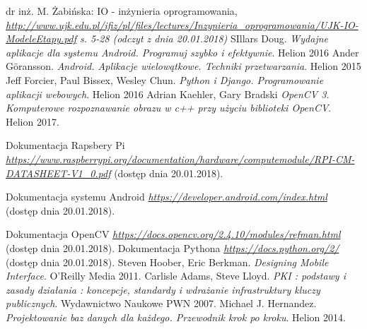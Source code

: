 \newpage
   \begin{thebibliography}{9}
    	dr inż. M. Żabińska: IO - inżynieria oprogramowania,
    	\textit{\href{http://www.ujk.edu.pl/ifiz/pl/files/lectures/Inzynieria\_oprogramowania/UJK-IO-ModeleEtapy.pdf}{http://www.ujk.edu.pl/ifiz/pl/files/lectures/Inzynieria\_oprogramowania/UJK-IO-ModeleEtapy.pdf} s. 5-28 (odczyt z dnia 20.01.2018)}
    	SIllars Doug.
    	\textit{Wydajne aplikacje dla systemu Android. Programuj szybko i efektywnie}. 
    	Helion 2016
    	Ander Göransson. 
    	\textit{Android. Aplikacje wielowątkowe. Techniki przetwarzania}. 
    	Helion 2015
    	Jeff Forcier, Paul Bissex, Wesley Chun.
    	\textit{Python i Django. Programowanie aplikacji webowych}. 
    	Helion 2016
    	Adrian Kaehler, Gary Bradski 
    	\textit{OpenCV 3. Komputerowe rozpoznawanie obrazu w c++ przy użyciu biblioteki OpenCV}. 
    	Helion 2017.
    
    		Dokumentacja Rapsbery Pi
    	\textit{ \href {https://www.raspberrypi.org/documentation/hardware/computemodule/RPI-CM-DATASHEET-V1_0.pdf} {https://www.raspberrypi.org/documentation/hardware/computemodule/RPI-CM-DATASHEET-V1\_0.pdf} }(dostęp dnia 20.01.2018). 
    	
    	Dokumentacja systemu Android
    	\textit{ \href {https://developer.android.com/index.html} {https://developer.android.com/index.html} }(dostęp dnia 20.01.2018). 
    	
    	Dokumentacja OpenCV
    	\textit{ \href {https://docs.opencv.org/2.4.10/modules/refman.html} {https://docs.opencv.org/2.4.10/modules/refman.html}} (dostęp dnia 20.01.2018). 
    	Dokumentacja Pythona
    	\textit{ \href  {https://docs.python.org/2/}{https://docs.python.org/2/} }(dostęp dnia 20.01.2018). 
    	Steven Hoober, Eric Berkman. 
    	\textit{Designing Mobile Interface}. 
    	 O'Reilly Media 2011.
    	 Carlisle Adams, Steve Lloyd. 
    	 \textit{PKI : podstawy i zasady działania : koncepcje, standardy i wdrażanie infrastruktury kluczy publicznych}. 
    	 Wydawnictwo Naukowe PWN 2007.
    	 Michael J. Hernandez. 
    	 \textit{Projektowanie baz danych dla każdego. Przewodnik krok po kroku}. 
    	 Helion 2014.
    	  
	 \end{thebibliography}
 
